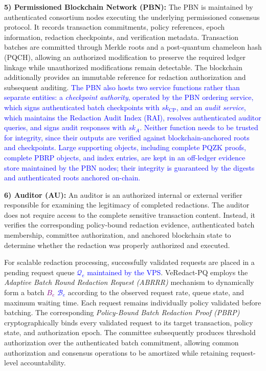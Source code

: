 \documentclass[lettersize,journal]{IEEEtran}
\begin{document}
\textbf{5) Permissioned Blockchain Network (PBN):}
The PBN is maintained by authenticated consortium nodes executing the
underlying permissioned consensus protocol. It records transaction
commitments, policy references, epoch information, redaction
checkpoints, and verification metadata. 
Transaction batches are
committed through Merkle roots and a post-quantum chameleon hash
(PQCH), allowing an authorized modification to preserve the required
ledger linkage while unauthorized modifications remain detectable.
The blockchain additionally provides an immutable reference for
redaction authorization and subsequent auditing.
\textcolor{blue}{The PBN also hosts two service functions rather than
separate entities: a \emph{checkpoint authority}, operated by the PBN
ordering service, which signs authenticated batch checkpoints with
$sk_{\mathrm{CP}}$, and an \emph{audit service}, which maintains the
Redaction Audit Index (RAI), resolves authenticated auditor queries, and
signs audit responses with $sk_A$. Neither function needs to be trusted
for integrity, since their outputs are verified against
blockchain-anchored roots and checkpoints. Large supporting objects,
including complete PQZK proofs, complete PBRP objects, and index
entries, are kept in an off-ledger evidence store maintained by the PBN
nodes; their integrity is guaranteed by the digests and authenticated
roots anchored on-chain.}

\textbf{6) Auditor (AU):}
An auditor is an authorized internal or external verifier responsible
for examining the legitimacy of completed redactions. The auditor does
not require access to the complete sensitive transaction content.
Instead, it verifies the corresponding policy-bound redaction evidence,
authenticated batch membership, committee authorization, and anchored
blockchain state to determine whether the redaction was properly
authorized and executed.

For scalable redaction processing, successfully validated requests are
placed in a pending request queue\textcolor{blue}{ $\mathcal{Q}_e$ maintained by the VPS}. VeRedact-PQ employs the
\emph{Adaptive Batch Round Redaction Request (ABRRR)} mechanism to
dynamically form a batch \textcolor{purple}{$B_e$}\textcolor{blue}{ $\mathcal{B}_e$} according to the observed request rate,
queue state, and maximum waiting time. Each request remains
individually policy validated before batching. The corresponding
\emph{Policy-Bound Batch Redaction Proof (PBRP)} cryptographically
binds every validated request to its target transaction, policy state,
and authorization epoch. The committee subsequently produces threshold
authorization over the authenticated batch commitment, allowing common
authorization and consensus operations to be amortized while retaining
request-level accountability.
\end{document}
